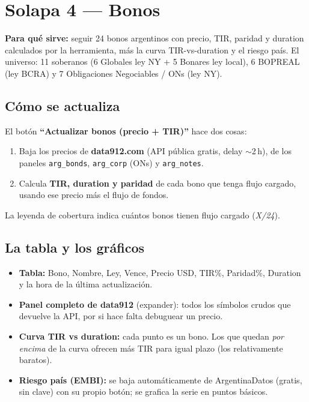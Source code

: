 \documentclass[11pt,a4paper]{article}
\newcommand{\code}[1]{\texttt{#1}}
\begin{document}
\section{Solapa 4 --- Bonos}

\textbf{Para qu\'e sirve:} seguir 24 bonos argentinos con precio, TIR, paridad y
duration calculados por la herramienta, m\'as la curva TIR-vs-duration y el riesgo
pa\'is. El universo: 11 soberanos (6 Globales ley NY + 5 Bonares ley local),
6 BOPREAL (ley BCRA) y 7 Obligaciones Negociables / ONs (ley NY).

\subsection{C\'omo se actualiza}

El bot\'on \textbf{``Actualizar bonos (precio + TIR)''} hace dos cosas:

\begin{enumerate}[leftmargin=1.4em]
  \item Baja los precios de \textbf{data912.com} (API p\'ublica gratis, delay
  $\sim$2\,h), de los paneles \code{arg\_bonds}, \code{arg\_corp} (ONs) y
  \code{arg\_notes}.
  \item Calcula \textbf{TIR, duration y paridad} de cada bono que tenga flujo cargado,
  usando ese precio m\'as el flujo de fondos.
\end{enumerate}

La leyenda de cobertura indica cu\'antos bonos tienen flujo cargado (\emph{X/24}).

\subsection{La tabla y los gr\'aficos}

\begin{itemize}[leftmargin=1.4em]
  \item \textbf{Tabla:} Bono, Nombre, Ley, Vence, Precio USD, TIR\%, Paridad\%,
  Duration y la hora de la \'ultima actualizaci\'on.
  \item \textbf{Panel completo de data912} (expander): todos los s\'imbolos crudos que
  devuelve la API, por si hace falta debuguear un precio.
  \item \textbf{Curva TIR vs duration:} cada punto es un bono. Los que quedan
  \emph{por encima} de la curva ofrecen m\'as TIR para igual plazo (los relativamente
  baratos).
  \item \textbf{Riesgo pa\'is (EMBI):} se baja autom\'aticamente de ArgentinaDatos
  (gratis, sin clave) con su propio bot\'on; se grafica la serie en puntos b\'asicos.
\end{itemize}
\end{document}
